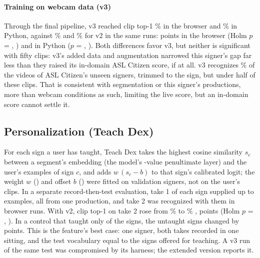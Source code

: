 \paragraph*{Training on webcam data (v3)}
Through the final pipeline, v3 reached clip top-1 \%  in the browser
and \%  in Python, against \% and \% for v2 in
the same runs:  points in the browser (Holm $p$ = ,
) and  in Python ($p$ = , ). Both
differences favor v3, but neither is significant with fifty clips: v3's added data and
augmentation narrowed this signer's gap far less than they raised its in-domain ASL Citizen score,
if at all. v3 recognizes \% of the videos of ASL Citizen's unseen signers, trimmed
to the sign, but under half of these clips. That is consistent with segmentation or this signer's
productions, more than webcam conditions as such, limiting the live score, but an in-domain score
cannot settle it.

\subsection{Personalization (Teach Dex)}
\label{sec:teach}

For each sign a user has taught, Teach Dex takes the highest cosine similarity $s_c$ between a
segment's embedding (the model's -value penultimate layer) and the user's examples
of sign $c$, and adds $w\,(s_c - b)$ to that sign's calibrated logit; the weight $w$
() and offset $b$ () were fitted on validation signers, not on
the user's clips. In a separate record-then-test evaluation, take 1 of each sign supplied up to
 examples, all from one production, and take 2 was recognized with them in
 browser runs. With v2, clip top-1 on take 2
rose from \%  to \% ,
 points  (Holm $p$ = , ). In a control that
taught only  of the signs, the untaught signs changed by  points. This
is the feature's best case: one signer, both takes recorded in one sitting, and the test
vocabulary equal to the signs offered for teaching. A v3 run of the same test was compromised by
its harness; the extended version reports it.

